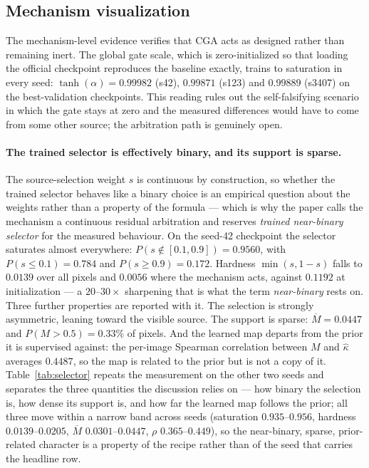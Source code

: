 \documentclass[pdflatex,sn-mathphys-num]{sn-jnl}
\theoremstyle{thmstyleone}%
\theoremstyle{thmstyletwo}%
\theoremstyle{thmstylethree}%
\begin{document}
\subsection{Mechanism visualization}\label{sec:exp:vis}

The mechanism-level evidence verifies that CGA acts as designed rather than remaining inert. The global gate scale, which is zero-initialized so that loading the official checkpoint reproduces the baseline exactly, trains to saturation in every seed: $\tanh(\alpha) = 0.99982$ (s42), $0.99871$ (s123) and $0.99889$ (s3407) on the best-validation checkpoints. This reading rules out the self-falsifying scenario in which the gate stays at zero and the measured differences would have to come from some other source; the arbitration path is genuinely open.

\paragraph{The trained selector is effectively binary, and its support is sparse.} The source-selection weight $s$ is continuous by construction, so whether the trained selector behaves like a binary choice is an empirical question about the weights rather than a property of the formula --- which is why the paper calls the mechanism a continuous residual arbitration and reserves \emph{trained near-binary selector} for the measured behaviour. On the seed-42 checkpoint the selector saturates almost everywhere: $P(s \notin [0.1, 0.9]) = 0.9560$, with $P(s \le 0.1) = 0.784$ and $P(s \ge 0.9) = 0.172$. Hardness $\min(s, 1-s)$ falls to $0.0139$ over all pixels and $0.0056$ where the mechanism acts, against $0.1192$ at initialization --- a $20$--$30\times$ sharpening that is what the term \emph{near-binary} rests on. Three further properties are reported with it. The selection is strongly asymmetric, leaning toward the visible source. The support is sparse: $\overline{M} = 0.0447$ and $P(M > 0.5) = 0.33\%$ of pixels. And the learned map departs from the prior it is supervised against: the per-image Spearman correlation between $M$ and $\hat\kappa$ averages $0.4487$, so the map is related to the prior but is not a copy of it. Table~\ref{tab:selector} repeats the measurement on the other two seeds and separates the three quantities the discussion relies on --- how binary the selection is, how dense its support is, and how far the learned map follows the prior; all three move within a narrow band across seeds (saturation $0.935$--$0.956$, hardness $0.0139$--$0.0205$, $\overline{M}$ $0.0301$--$0.0447$, $\rho$ $0.365$--$0.449$), so the near-binary, sparse, prior-related character is a property of the recipe rather than of the seed that carries the headline row.
\end{document}
